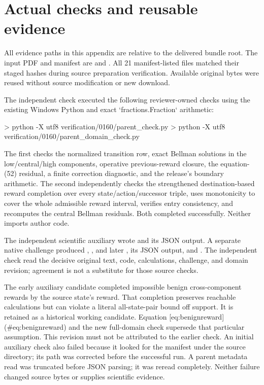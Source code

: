 \documentclass[10pt]{article}
\begin{document}
\section*{Actual checks and reusable evidence}
All evidence paths in this appendix are relative to the delivered bundle root. The input PDF and manifest are and . All 21 manifest-listed files matched their staged hashes during source preparation verification. Available original bytes were reused without source modification or new download.\par
The independent check executed the following reviewer-owned checks using the existing Windows Python and exact `fractions.Fraction` arithmetic:\par
> python -X utf8 verification/0160/parent\_check.py
> python -X utf8 verification/0160/parent\_domain\_check.py\par
The first checks the normalized transition row, exact Bellman solutions in the low/central/high components, operative previous-reward closure, the equation-(52) residual, a finite correction diagnostic, and the release’s boundary arithmetic. The second independently checks the strengthened destination-based reward completion over every state/action/successor triple, uses monotonicity to cover the whole admissible reward interval, verifies entry consistency, and recomputes the central Bellman residuals. Both completed successfully. Neither imports author code.\par
The independent scientific auxiliary wrote and its JSON output. A separate native challenge produced , , and later , its JSON output, and . The independent check read the decisive original text, code, calculations, challenge, and domain revision; agreement is not a substitute for those source checks.\par
The early auxiliary candidate completed impossible benign cross-component rewards by the source state’s reward. That completion preserves reachable calculations but can violate a literal all-state-pair bound off support. It is retained as a historical working candidate. Equation [eq:benignreward] (\#eq:benignreward) and the new full-domain check supersede that particular assumption. This revision must not be attributed to the earlier check. An initial auxiliary check also failed because it looked for the manifest under the source directory; its path was corrected before the successful run. A parent metadata read was truncated before JSON parsing; it was reread completely. Neither failure changed source bytes or supplies scientific evidence.\par
\end{document}
